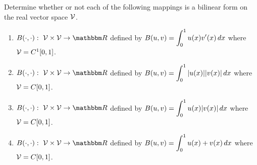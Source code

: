 Determine whether or not each of the following mappings is a bilinear form on the real vector space ${\cal V}$.

\begin{enumerate}
\item$\displaystyle{B\ip{\cdot,\cdot}:\mbox{ }\CV\times\CV\rightarrow\R}$ defined by $\displaystyle{B(u,v) = \int_0^1 u(x) v'(x)\, dx}$ where ${\cal V}=C^1[0,1]$.
\\
\item$\displaystyle{B\ip{\cdot,\cdot}:\mbox{ }\CV\times\CV\rightarrow\R}$ defined by $\displaystyle{B(u,v) = \int_0^1 |u(x)| |v(x)|\, dx}$ where ${\cal V}=C[0,1]$.
\\
\item$\displaystyle{B\ip{\cdot,\cdot}:\mbox{ }\CV\times\CV\rightarrow\R}$ defined by $\displaystyle{B(u,v) = \int_0^1 u(x) |v(x)|\, dx}$ where ${\cal V}=C[0,1]$.
\\
\item$\displaystyle{B\ip{\cdot,\cdot}:\mbox{ }\CV\times\CV\rightarrow\R}$ defined by $\displaystyle{B(u,v) = \int_0^1 u(x) + v(x)\, dx}$ where ${\cal V}=C[0,1]$.
\end{enumerate}



